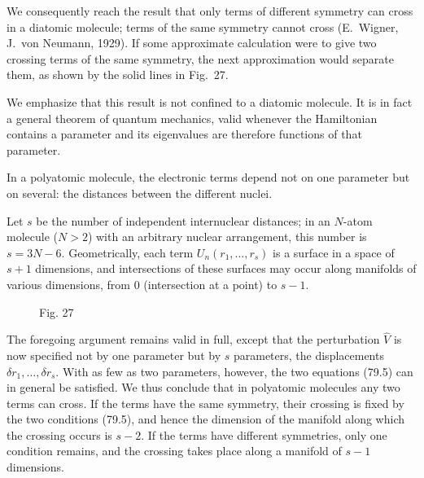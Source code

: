 




We consequently reach the result that only terms of different symmetry can cross in a diatomic molecule; terms of the same symmetry cannot cross (E.~Wigner, J.~von Neumann, 1929). If some approximate calculation were to give two crossing terms of the same symmetry, the next approximation would separate them, as shown by the solid lines in Fig.~27.

We emphasize that this result is not confined to a diatomic molecule. It is in fact a general theorem of quantum mechanics, valid whenever the Hamiltonian contains a parameter and its eigenvalues are therefore functions of that parameter.



In a polyatomic molecule, the electronic terms depend not on one parameter but on several: the distances between the different nuclei.

Let $s$ be the number of independent internuclear distances; in an $N$-atom molecule ($N>2$) with an arbitrary nuclear arrangement, this number is $s=3N-6$. Geometrically, each term $U_n(r_1,\ldots,r_s)$ is a surface in a space of $s+1$ dimensions, and intersections of these surfaces may occur along manifolds of various dimensions, from 0 (intersection at a point) to $s-1$.

\begin{figure}[ht]
\centering
{}
\caption*{Fig. 27}
\end{figure}

The foregoing argument remains valid in full, except that the perturbation $\widehat V$ is now specified not by one parameter but by $s$ parameters, the displacements $\delta r_1,\ldots,\delta r_s$. With as few as two parameters, however, the two equations (79.5) can in general be satisfied. We thus conclude that in polyatomic molecules any two terms can cross. If the terms have the same symmetry, their crossing is fixed by the two conditions (79.5), and hence the dimension of the manifold along which the crossing occurs is $s-2$. If the terms have different symmetries, only one condition remains, and the crossing takes place along a manifold of $s-1$ dimensions.

